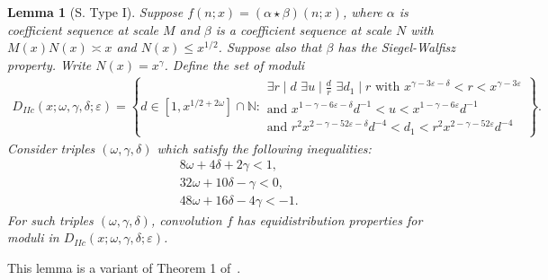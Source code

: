 \documentclass{amsart}
\newtheorem{lemma}{Lemma}
\numberwithin{equation}{section}
\begin{document}
\begin{lemma}[S. Type I] \label{lem:typeIS} 
Suppose $f(n;x) = (\alpha \star \beta)(n;x)$, where $\alpha$ is  coefficient sequence at scale $M$ and $\beta$ is a  coefficient sequence at scale $N$ with $M(x) N(x) \asymp x$ and $N(x) \leq x^{1/2}$. Suppose also that $\beta$ has the Siegel-Walfisz property. Write $N(x) = x^\gamma$. Define the set of moduli
\begin{align*}
D_{IIc}(x;\omega,\gamma,\delta;\varepsilon) = \left\{d \in  [1, x^{1/2+2\omega}]\cap \mathbb{N}:  \begin{array}{l} 
\exists r \mid d \,\, \exists u \mid \frac{d}{r} \,\, \exists d_1 \mid r \mbox{ with } x^{\gamma -3\varepsilon-\delta} < r < x^{\gamma - 3\varepsilon} \\ \mbox{and }    x^{1-\gamma-6\varepsilon-\delta}   d^{-1} < u < x^{1-\gamma-6\varepsilon}   d^{-1} \\ 
\mbox{and }  r^2 x^{2-\gamma-52\varepsilon -\delta}  d^{-4} < d_1 <  r^2 x^{2-\gamma-52\varepsilon}  d^{-4}
\end{array}\right\}.
\end{align*}
Consider triples $(\omega,\gamma,\delta)$ which satisfy the following inequalities: 
\begin{align*}
&8\omega+4\delta + 2\gamma < 1, \\
&32 \omega + 10 \delta -\gamma<0, \\
&48\omega +  16 \delta  -4\gamma  < -1.
\end{align*}
For such triples  $(\omega,\gamma,\delta)$, convolution $f$ has equidistribution properties for moduli in $D_{IIc}(x;\omega,\gamma,\delta;\varepsilon)$.
\end{lemma}

This lemma is a variant  of Theorem 1 of~\cite{Stadlmann:2023:PAP}.
\end{document}
